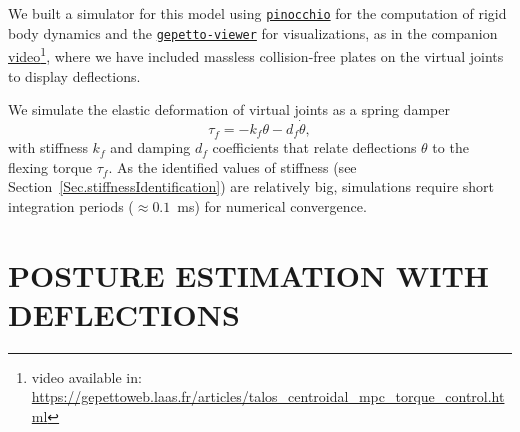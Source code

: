 \documentclass[letterpaper, 10 pt, conference]{ieeeconf}  %
\begin{document}
We built a simulator for this model using \href{https://github.com/stack-of-tasks/pinocchio}{\texttt{pinocchio}} \cite{Pinocchioweb} for the computation of rigid body dynamics and the \href{https://github.com/Gepetto/gepetto-viewer-corba}{\texttt{gepetto-viewer}} for visualizations, as in the companion \href{https://gepettoweb.laas.fr/articles/talos_centroidal_mpc_torque_control.html}{video}\footnote{video available in: \url{ https://gepettoweb.laas.fr/articles/talos_centroidal_mpc_torque_control.html}\label{video}}, where we have included massless collision-free plates on the virtual joints to display deflections.

We simulate the elastic deformation of virtual joints as a spring damper 
\begin{equation}
    \tau_f^{ } = -k_f \theta - d_f \dot{\theta}, \label{eq.ElasticBehaviour}
\end{equation}
with stiffness $ k_f $ and damping $ d_f $ coefficients that relate deflections $\theta$ to the flexing torque $ \tau_f^{ } $. As the identified values of stiffness (see Section~\ref{Sec.stiffnessIdentification}) are relatively big, simulations require short integration periods ($ \approx 0.1 $~ms) for numerical convergence. 


\section{POSTURE ESTIMATION WITH DEFLECTIONS}\label{Sec.CompensationOfDeflections}
\end{document}
